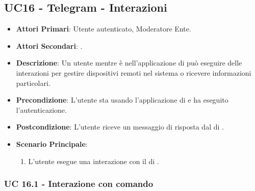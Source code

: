 \subsection{UC16 - Telegram - Interazioni}
		
		
	\begin{itemize}
		\item \textbf{Attori Primari}: Utente autenticato, Moderatore Ente.
		\item \textbf{Attori Secondari}: .
		\item \textbf{Descrizione}: Un utente mentre è nell'applicazione di  può eseguire delle interazioni per gestire dispositivi remoti nel sistema o ricevere informazioni particolari. 
		\item \textbf{Precondizione}: L'utente sta usando l'applicazione di  e ha eseguito l'autenticazione.
		\item \textbf{Postcondizione}: L'utente riceve un messaggio di risposta dal  di .
		\item \textbf{Scenario Principale}:
		\begin{enumerate}
			\item L'utente esegue una interazione con il  di .
		\end{enumerate}
	\end{itemize}
	
	\subsubsection{UC 16.1 - Interazione con comando}

